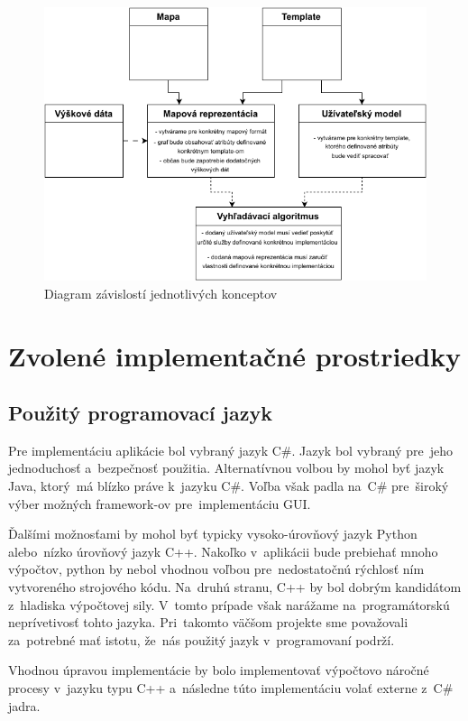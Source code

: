 \begin{figure}[h]\centering
\includegraphics[]{img/konceptove_zavislosti}
\caption{Diagram závislostí jednotlivých konceptov} 
\label{obr01:konceptove_zavislosti}
\end{figure}

\pagebreak

\section{Zvolené implementačné prostriedky}

\subsection{Použitý programovací jazyk}

Pre implementáciu aplikácie bol vybraný jazyk C\#. Jazyk bol vybraný pre~jeho jednoduchosť a~bezpečnosť použitia. Alternatívnou volbou by mohol byť jazyk Java, ktorý~má blízko práve k~jazyku C\#. Voľba však padla na~C\# pre~široký výber možných framework-ov pre~implementáciu GUI. 

Ďalšími možnosťami by mohol byť typicky vysoko-úrovňový jazyk Python alebo~nízko úrovňový jazyk C++. Nakoľko v~aplikácii bude prebiehať mnoho výpočtov, python by nebol vhodnou voľbou pre~nedostatočnú rýchlosť ním vytvoreného strojového kódu. Na~druhú stranu, C++ by bol dobrým kandidátom z~hladiska výpočtovej sily. V~tomto prípade však narážame na~programátorskú neprívetivosť tohto jazyka. Pri~takomto väčšom projekte sme považovali za~potrebné mať istotu, že~nás použitý jazyk v~programovaní podrží. 

Vhodnou úpravou implementácie by bolo implementovať výpočtovo náročné procesy v~jazyku typu C++ a~následne túto implementáciu volať externe z~C\# jadra.     

